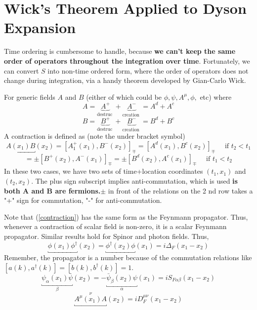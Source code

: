\section{Wick's Theorem Applied to Dyson Expansion}
Time ordering is cumbersome to handle, because \textbf{we can't keep the same order of operators throughout the integration over time}. Fortunately, we can convert $S$ into non-time ordered form, where the order of operators does not change during integration, via a handy theorem developed by Gian-Carlo Wick.

\begin{qt}
For generic fields $A$ and $B$ (either of which could be $\phi, \psi, A^{\mu}, \phi,$ etc) where
$$
A=\underbrace{A^{+}}_{\text {destruc }}+\underbrace{A^{-}}_{\text {creation }}=A^{d}+A^{c}
$$
$$
B=\underbrace{B^{+}}_{\text {destruc }}+\underbrace{B^{-}}_{\text {creation }}=B^{d}+B^{c}
$$
A contraction is defined as (note the under bracket symbol)
\begin{equation}
\underbracket{A\left(x_{1}\right) B}\left(x_{2}\right)=\left[A_{1}^{+}\left(x_{1}\right), B^{-}\left(x_{2}\right)\right]_{\mp}=\left[A^{d}\left(x_{1}\right), B^{c}\left(x_{2}\right)\right]_{\mp} \quad \text { if } t_{2}<t_{1}
\end{equation}
\begin{equation}
=\pm\left[B^{+}\left(x_{2}\right), A^{-} \left(x_{1}\right)\right]_{\mp}=\pm\left[B^{d}\left(x_{2}\right), A^{c}\left(x_{1}\right)\right]_{\mp} \quad \text { if } t_{1}<t_{2}
\label{contraction}
\end{equation}
In these two cases, we have two sets of time+location coordinates $(t_1,x_1)$ and $(t_2,x_2)$. The plus sign subscript implies anti-commutation, which is used \textbf{is both A and B are fermions.}$\pm$ in front of the relations on the 2 nd row takes a "+" sign for commutation, "-" for anti-commutation. 
\end{qt}
Note that (\ref{contraction}) has the same form as the Feynmann propagator. Thus, whenever a contraction of scalar field is non-zero, it is a scalar Feynmann propagator. Similar results hold for Spinor and photon fields. Thus, 
$$
\underbracket{\phi\left(x_{1}\right) \phi^{\dagger}}\left(x_{2}\right)=\underbracket{\phi^{\dagger}\left(x_{2}\right) \phi}\left(x_{1}\right)=i \Delta_{F}\left(x_{1}-x_{2}\right)
$$
Remember, the propagator is a number because of the commutation relations like $[a(k),a^{\dagger}(k)]=[b(k),b^{\dagger}(k)]=1$.
$$
\underbracket{\psi_{\alpha}\left(x_{1}\right) \bar{\psi}}_{\beta}\left(x_{2}\right)=-\underbracket{\bar{\psi}_{\beta}\left(x_{2}\right) \psi}_{\alpha}\left(x_{1}\right)=i S_{F \alpha \beta}\left(x_{1}-x_{2}\right)
$$
$$
\underbracket{A^{\mu}\left(x_{1}\right) A}^{\nu}\left(x_{2}\right)=i D_{F}^{\mu \nu}\left(x_{1}-x_{2}\right)
$$
